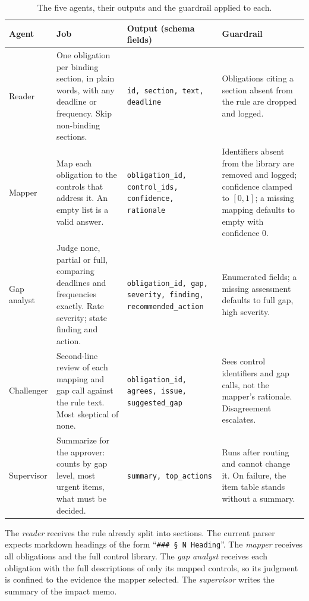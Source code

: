 \documentclass[sigconf,review,anonymous]{acmart}
\newcommand{\gapnone}{\textsf{none}}
\newcommand{\gappartial}{\textsf{partial}}
\newcommand{\gapfull}{\textsf{full}}
\begin{document}
\begin{table}[t]
  \caption{The five agents, their outputs and the guardrail applied to each.}
  \label{tab:agents}
  \small
  \begin{tabular}{@{}p{2.1cm}p{5.0cm}p{4.2cm}p{4.6cm}@{}}
    \toprule
    Agent & Job & Output (schema fields) & Guardrail \\
    \midrule
    Reader & One obligation per binding section, in plain words, with any deadline or frequency. Skip non-binding sections. &
      \texttt{id, section, text, deadline} &
      Obligations citing a section absent from the rule are dropped and logged. \\
    Mapper & Map each obligation to the controls that address it. An empty list is a valid answer. &
      \texttt{obligation\_id, control\_ids, confidence, rationale} &
      Identifiers absent from the library are removed and logged; confidence clamped to $[0,1]$; a missing mapping defaults to empty with confidence 0. \\
    Gap analyst & Judge \gapnone{}, \gappartial{} or \gapfull{}, comparing deadlines and frequencies exactly. Rate severity; state finding and action. &
      \texttt{obligation\_id, gap, severity, finding, recommended\_action} &
      Enumerated fields; a missing assessment defaults to \gapfull{} gap, high severity. \\
    Challenger & Second-line review of each mapping and gap call against the rule text. Most skeptical of \gapnone{}. &
      \texttt{obligation\_id, agrees, issue, suggested\_gap} &
      Sees control identifiers and gap calls, not the mapper's rationale. Disagreement escalates. \\
    Supervisor & Summarize for the approver: counts by gap level, most urgent items, what must be decided. &
      \texttt{summary, top\_actions} &
      Runs after routing and cannot change it. On failure, the item table stands without a summary. \\
    \bottomrule
  \end{tabular}
\end{table}

The \emph{reader} receives the rule already split into sections. The
current parser expects markdown headings of the form
``\texttt{\#\#\# \S{} N Heading}''. The \emph{mapper} receives all
obligations and the full control library. The \emph{gap analyst} receives
each obligation with the full descriptions of only its mapped controls, so
its judgment is confined to the evidence the mapper selected. The
\emph{supervisor} writes the summary of the impact memo.
\end{document}
